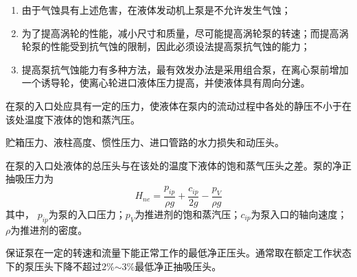 \vspace*{-0.5em}
\begin{enumerate}[\hspace*{3em} $\bigstar$]
	\item 由于气蚀具有上述危害，在液体发动机上泵是不允许发生气蚀；\vspace*{-0.5em}
	\item 为了提高涡轮的性能，减小尺寸和质量，尽可能提高涡轮泵的转速；而提高涡轮泵的性能受到抗气蚀的限制，因此必须设法提高泵抗气蚀的能力；\vspace*{-0.5em}
	\item 提高泵抗气蚀能力有多种方法，最有效发办法是采用组合泵，在离心泵前增加一个诱导轮，使离心轮进口液体压力提高，并使液体具有周向分速。
\end{enumerate}
\vspace*{0.5em}

\sssection[净正抽吸压头及气蚀比转速]


在泵的入口处应具有一定的压力，使液体在泵内的流动过程中各处的静压不小于在该处温度下液体的饱和蒸汽压。
\vspace*{0.5em}


贮箱压力、液柱高度、惯性压力、进口管路的水力损失和动压头。
\vspace*{0.5em}

\blue[(3)]\hspace*{0.3em} 

在泵的入口处液体的总压头与在该处的温度下液体的饱和蒸气压头之差。泵的净正抽吸压力为
\begin{equation}
	H_{ne} = \dfrac{p_{ip}}{\rho g} + \dfrac{c_{ip}}{2g} - \dfrac{p_V}{\rho g}
\end{equation}
其中， $p_{ip}$为泵的入口压力；$p_V$为推进剂的饱和蒸汽压；$c_{ip}$为泵入口的轴向速度；$\rho$为推进剂的密度。
\vspace*{0.5em}

\blue[(4)]\hspace*{0.3em} 

保证泵在一定的转速和流量下能正常工作的最低净正压头。通常取在额定工作状态下的泵压头下降不超过2\%$\sim$3\%最低净正抽吸压头。
\vspace*{0.5em}

